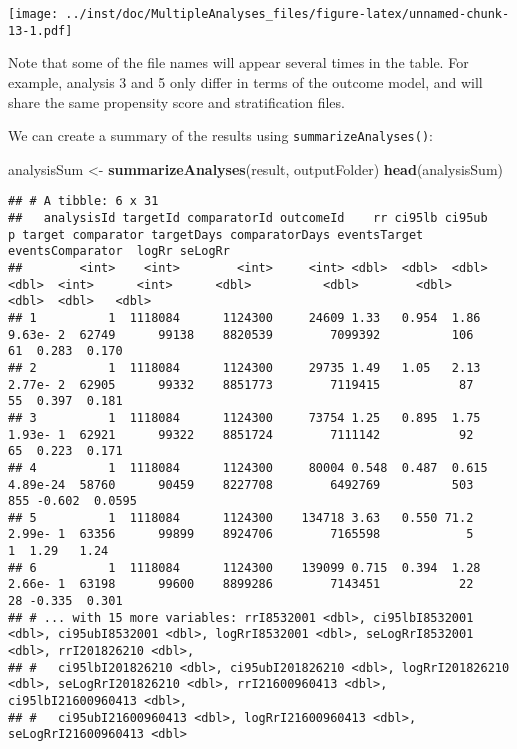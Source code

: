 \documentclass[
]{article}
\newenvironment{Shaded}{\begin{snugshade}}{\end{snugshade}}
\newcommand{\KeywordTok}[1]{\textcolor[rgb]{0.13,0.29,0.53}{\textbf{#1}}}
\newcommand{\NormalTok}[1]{#1}
\newcommand{\StringTok}[1]{\textcolor[rgb]{0.31,0.60,0.02}{#1}}
\begin{document}
\texttt{[image: ../inst/doc/MultipleAnalyses\_files/figure-latex/unnamed-chunk-13-1.pdf]}

Note that some of the file names will appear several times in the table.
For example, analysis 3 and 5 only differ in terms of the outcome model,
and will share the same propensity score and stratification files.

We can create a summary of the results using
\texttt{summarizeAnalyses()}:

\begin{Shaded}
\begin{Highlighting}[]
\NormalTok{analysisSum <-}\StringTok{ }\KeywordTok{summarizeAnalyses}\NormalTok{(result, outputFolder)}
\KeywordTok{head}\NormalTok{(analysisSum)}
\end{Highlighting}
\end{Shaded}

\begin{verbatim}
## # A tibble: 6 x 31
##   analysisId targetId comparatorId outcomeId    rr ci95lb ci95ub        p target comparator targetDays comparatorDays eventsTarget eventsComparator  logRr seLogRr
##        <int>    <int>        <int>     <int> <dbl>  <dbl>  <dbl>    <dbl>  <int>      <int>      <dbl>          <dbl>        <dbl>            <dbl>  <dbl>   <dbl>
## 1          1  1118084      1124300     24609 1.33   0.954  1.86  9.63e- 2  62749      99138    8820539        7099392          106               61  0.283  0.170 
## 2          1  1118084      1124300     29735 1.49   1.05   2.13  2.77e- 2  62905      99332    8851773        7119415           87               55  0.397  0.181 
## 3          1  1118084      1124300     73754 1.25   0.895  1.75  1.93e- 1  62921      99322    8851724        7111142           92               65  0.223  0.171 
## 4          1  1118084      1124300     80004 0.548  0.487  0.615 4.89e-24  58760      90459    8227708        6492769          503              855 -0.602  0.0595
## 5          1  1118084      1124300    134718 3.63   0.550 71.2   2.99e- 1  63356      99899    8924706        7165598            5                1  1.29   1.24  
## 6          1  1118084      1124300    139099 0.715  0.394  1.28  2.66e- 1  63198      99600    8899286        7143451           22               28 -0.335  0.301 
## # ... with 15 more variables: rrI8532001 <dbl>, ci95lbI8532001 <dbl>, ci95ubI8532001 <dbl>, logRrI8532001 <dbl>, seLogRrI8532001 <dbl>, rrI201826210 <dbl>,
## #   ci95lbI201826210 <dbl>, ci95ubI201826210 <dbl>, logRrI201826210 <dbl>, seLogRrI201826210 <dbl>, rrI21600960413 <dbl>, ci95lbI21600960413 <dbl>,
## #   ci95ubI21600960413 <dbl>, logRrI21600960413 <dbl>, seLogRrI21600960413 <dbl>
\end{verbatim}
\end{document}
